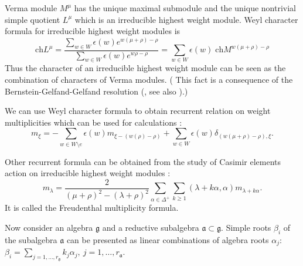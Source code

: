 \documentclass[preprint,12pt]{elsarticle}
\newcommand{\gf}{\mathfrak{g}}
\newcommand{\af}{\mathfrak{a}}
\begin{document}
Verma module $M^{\mu}$ has the unique maximal submodule and the
unique nontrivial simple quotient $L^{\mu}$ which is an
irreducible highest weight module. Weyl character formula for
irreducible highest weight modules is
\begin{equation}
  \label{eq:13}
  \mathrm{ch} L^{\mu}=\frac{\sum_{w\in W} \epsilon(w) e^{w(\mu+\rho)-\rho}}{\sum_{w\in W}\epsilon(w) e^{w\rho-\rho}}=\sum_{w\in W} \epsilon(w)\; \mathrm{ch} M^{w(\mu+\rho)-\rho}
\end{equation}
Thus the character of an irreducible highest weight module can be
seen as the combination of characters of Verma modules. ( This
fact is a consequence of the Bernstein-Gelfand-Gelfand resolution
(\cite{bernstein1976category,bernstein1971structure}, see also
\cite{humphreys2008representations}).)


We can use Weyl character formula to obtain recurrent relation on weight multiplicities which can be used for calculations \cite{il2010folded,kulish4sfa}:
\begin{equation}
\label{eq:14}
m_{\xi }=-\sum_{w\in W\setminus e}\epsilon (w)m_{\xi
-\left( w(\rho )-\rho \right) }+\sum_{w\in W}\epsilon
(w)\delta _{\left( w(\mu +\rho )-\rho \right) ,\xi }.
\end{equation}

Other recurrent formula can be obtained from the study of Casimir
elements action on irreducible highest weight modules
\cite{humphreys1997introduction}:
\begin{equation}
  \label{eq:15}
  m_{\lambda}=\frac{2}{(\mu+\rho)^{2}-(\lambda+\rho)^{2}}\sum_{\alpha\in \Delta^{+}}\sum_{k\geq 1} (\lambda+k\alpha,\alpha)m_{\lambda+k\alpha}.
\end{equation}
It is called the Freudenthal multiplicity formula.

Now consider an algebra $\gf$ and a reductive subalgebra
$\af\subset \gf$. Simple roots $\beta_{i}$ of the subalgebra $\af$
can be presented as linear combinations of algebra roots
$\alpha_{j}$: $\beta_{i}=\sum_{j=1,\dots,r_{\gf}}k_{j}
\alpha_{j},\ j=1,\dots,r_{\af}$.
\end{document}
